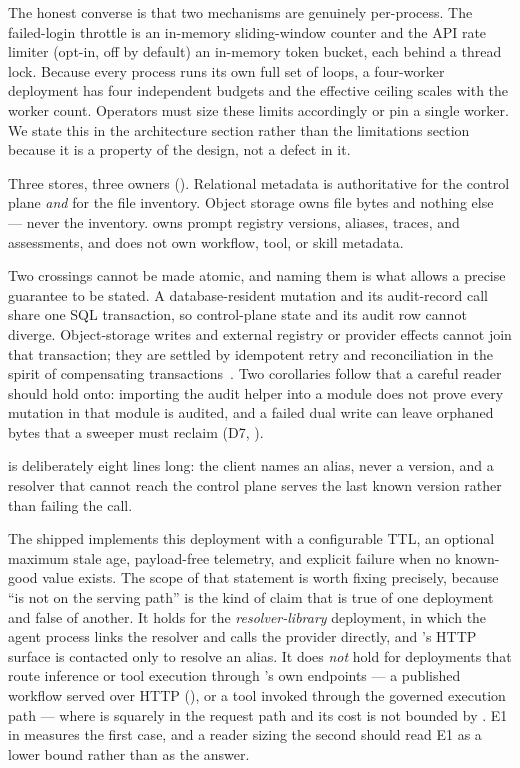 The honest converse is that two mechanisms are genuinely per-process. The
failed-login throttle is an in-memory sliding-window counter and the API rate
limiter (opt-in, off by default) an in-memory token bucket, each behind a thread
lock. Because every
process runs its own full set of loops, a four-worker deployment has four
independent budgets and the effective ceiling scales with the worker count.
Operators must size these limits accordingly or pin a single worker.
We state this in the architecture section rather than the limitations section
because it is a property of the design, not a defect in it.




Three stores, three owners (). Relational metadata is
authoritative for the control plane \emph{and} for the file inventory. Object
storage owns file bytes and nothing else --- never the inventory. \mlflow{} owns
prompt registry versions, aliases, traces, and assessments, and does not own
workflow, tool, or skill metadata.

Two crossings cannot be made atomic, and naming them is what allows a precise
guarantee to be stated. A database-resident mutation and its audit-record call
share one SQL transaction, so control-plane state and its audit row cannot diverge.
Object-storage writes and external registry or provider effects cannot join that
transaction; they are settled by idempotent retry and reconciliation in the spirit
of compensating transactions~\cite{garciamolina1987sagas,helland2007apostates}.
Two corollaries follow that a careful reader should hold onto: importing the audit
helper into a module does not prove every mutation in that module is audited, and
a failed dual write can leave orphaned bytes that a sweeper must reclaim (D7,
).

  is deliberately eight lines long: the
client names an alias, never a version, and a resolver that cannot reach the
control plane serves the last known version rather than failing the call.

The shipped  implements this deployment
with a configurable TTL, an optional maximum stale age, payload-free telemetry,
and explicit failure when no known-good value exists. The scope of that statement
is worth fixing precisely, because ``\sys is not on
the serving path'' is the kind of claim that is true of one deployment and false of
another. It holds for the \emph{resolver-library} deployment, in which the agent
process links the resolver and calls the provider directly, and \sys's HTTP surface
is contacted only to resolve an alias. It does \emph{not} hold for deployments that
route inference or tool execution through \sys's own endpoints --- a published
workflow served over HTTP (), or a tool invoked through
the governed execution path --- where \sys is squarely in the request path and its
cost is not bounded by . E1 in  measures the
first case, and a reader sizing the second should read E1 as a lower bound rather
than as the answer.


